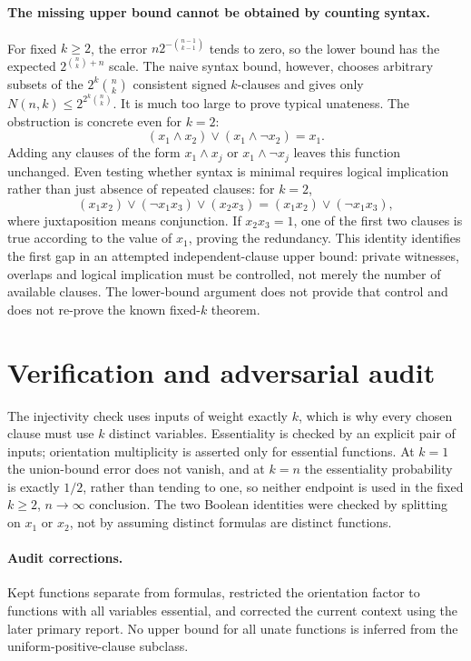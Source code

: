\documentclass[11pt]{article}
\begin{document}
\paragraph{The missing upper bound cannot be obtained by counting syntax.}
For fixed $k\geq2$, the error $n2^{-\binom{n-1}{k-1}}$ tends to zero, so the
lower bound has the expected $2^{\binom nk+n}$ scale. The naive syntax bound,
however, chooses arbitrary subsets of the $2^k\binom nk$ consistent signed
$k$-clauses and gives only $N(n,k)\leq2^{2^k\binom nk}$.
It is much too large to prove typical unateness.
The obstruction is concrete even for $k=2$:
\[
 (x_1\wedge x_2)\vee(x_1\wedge\neg x_2)=x_1.
\]
Adding any clauses of the form $x_1\wedge x_j$ or $x_1\wedge\neg x_j$ leaves
this function unchanged. Even testing whether syntax is minimal requires logical
implication rather than just absence of repeated clauses: for $k=2$,
\[
 (x_1x_2)\vee(\neg x_1x_3)\vee(x_2x_3)
 =(x_1x_2)\vee(\neg x_1x_3),
\]
where juxtaposition means conjunction. If $x_2x_3=1$, one of the first two
clauses is true according to the value of $x_1$, proving the redundancy.
This identity identifies the first gap in an attempted independent-clause upper
bound: private witnesses, overlaps and logical implication must be controlled,
not merely the number of available clauses. The lower-bound argument does not
provide that control and does not re-prove the known fixed-$k$ theorem.

\section{Verification and adversarial audit}

The injectivity check uses inputs of weight exactly $k$, which is why every
chosen clause must use $k$ distinct variables. Essentiality is checked by an
explicit pair of inputs; orientation multiplicity is asserted only for essential
functions. At $k=1$ the union-bound error does not vanish, and at $k=n$ the essentiality
probability is exactly $1/2$, rather than tending to one, so neither endpoint is used in the fixed
$k\geq2$, $n\to\infty$ conclusion. The two Boolean identities were checked
by splitting on $x_1$ or $x_2$, not by assuming distinct formulas are distinct
functions.

\paragraph{Audit corrections.} Kept functions separate from formulas, restricted the orientation factor to
functions with all variables essential, and corrected the current context using
the later primary report. No upper bound for all unate functions is inferred
from the uniform-positive-clause subclass.
\end{document}
